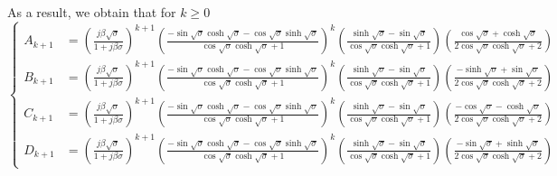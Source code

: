 \documentclass{article}
\begin{document}
As a result, we obtain that for $k \geq 0$
\scriptsize
\begin{equation}
    \left\{\begin{aligned}
        A_{k+1} &= \left( \frac{j \beta \sqrt{\sigma }}{1+j \beta \sigma } \right)^{k+1} \left( \frac{ -\sin\sqrt{\sigma} \cosh\sqrt{\sigma} - \cos\sqrt{\sigma} \sinh\sqrt{\sigma} }{ \cos\sqrt{\sigma }\cosh\sqrt{\sigma }+1 } \right)^k \left( \frac{\sinh\sqrt{\sigma }-\sin\sqrt{\sigma }}{\cos\sqrt{\sigma } \cosh\sqrt{\sigma }+1} \right) \left(\frac{\cos\sqrt{\sigma }+\cosh\sqrt{\sigma }}{2 \cos\sqrt{\sigma }\cosh\sqrt{\sigma }+2} \right) \\
        B_{k+1} &= \left( \frac{j \beta \sqrt{\sigma }}{1+j \beta \sigma } \right)^{k+1}  \left( \frac{ -\sin\sqrt{\sigma} \cosh\sqrt{\sigma} - \cos\sqrt{\sigma} \sinh\sqrt{\sigma} }{ \cos\sqrt{\sigma }\cosh\sqrt{\sigma }+1 } \right)^k \left( \frac{\sinh\sqrt{\sigma }-\sin\sqrt{\sigma }}{\cos\sqrt{\sigma } \cosh\sqrt{\sigma }+1} \right) \left( \frac{-\sinh\sqrt{\sigma }+\sin\sqrt{\sigma }}{2 \cos\sqrt{\sigma }\cosh\sqrt{\sigma }+2} \right) \\
        C_{k+1} &= \left( \frac{j \beta \sqrt{\sigma }}{1+j \beta \sigma } \right)^{k+1}  \left( \frac{ -\sin\sqrt{\sigma} \cosh\sqrt{\sigma} - \cos\sqrt{\sigma} \sinh\sqrt{\sigma} }{ \cos\sqrt{\sigma }\cosh\sqrt{\sigma }+1 } \right)^k \left( \frac{\sinh\sqrt{\sigma }-\sin\sqrt{\sigma }}{\cos\sqrt{\sigma } \cosh\sqrt{\sigma }+1} \right) \left( \frac{-\cos\sqrt{\sigma }-\cosh\sqrt{\sigma }}{2 \cos\sqrt{\sigma } \cosh\sqrt{\sigma }+2} \right) \\
        D_{k+1} &= \left( \frac{j \beta \sqrt{\sigma }}{1+j \beta \sigma } \right)^{k+1} \left( \frac{ -\sin\sqrt{\sigma} \cosh\sqrt{\sigma} - \cos\sqrt{\sigma} \sinh\sqrt{\sigma} }{ \cos\sqrt{\sigma }\cosh\sqrt{\sigma }+1 } \right)^k \left( \frac{\sinh\sqrt{\sigma }-\sin\sqrt{\sigma }}{\cos\sqrt{\sigma } \cosh\sqrt{\sigma }+1} \right) \left( \frac{-\sin\sqrt{\sigma }+\sinh\sqrt{\sigma }}{2 \cos\sqrt{\sigma }\cosh\sqrt{\sigma }+2} \right)
    \end{aligned}\right.
\end{equation}
\normalsize
\end{document}
